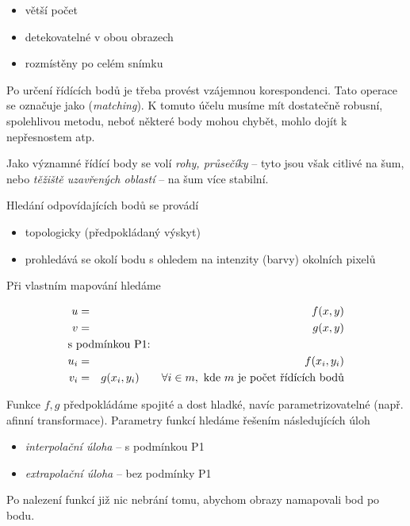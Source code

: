 
\begin{itemize}
\item větší počet
\item detekovatelné v obou obrazech
\item rozmístěny po celém snímku
\end{itemize}

Po určení řídících bodů je třeba provést vzájemnou korespondenci. Tato operace se označuje jako ({\em matching}). 
K tomuto účelu musíme mít dostatečně robusní, spolehlivou metodu, neboť některé body mohou chybět, mohlo dojít
k nepřesnostem atp. 

Jako významné řídící body se volí {\em rohy, průsečíky} -- tyto jsou však citlivé na šum, nebo {\em těžiště uzavřených 
oblastí} -- na šum více stabilní.

Hledání odpovídajících bodů se provádí
\begin{itemize} 
\item topologicky (předpokládaný výskyt)
\item prohledává se okolí bodu s ohledem na intenzity (barvy) okolních pixelů
\end{itemize}


Při vlastním mapování hledáme

\begin{eqnarray}
u&=&f(x,y)\\
v&=&g(x,y)\\
\noalign{\hbox{s podmínkou P1:}\nonumber}
u_i&=&f(x_i,y_i)\\
v_i&=&g(x_i,y_i)\qquad\forall i\in m,\ \hbox{kde $m$ je počet řídících bodů}
\end{eqnarray}

Funkce $f,g$ předpokládáme spojité a dost hladké, navíc parametrizovatelné (např. afinní transformace). 
Parametry funkcí hledáme řešením následujících úloh
\begin{itemize}
\item {\em interpolační úloha} -- s podmínkou P1
\item {\em extrapolační úloha} -- bez podmínky P1
\end{itemize}

Po nalezení funkcí již nic nebrání tomu, abychom obrazy namapovali bod po bodu.

